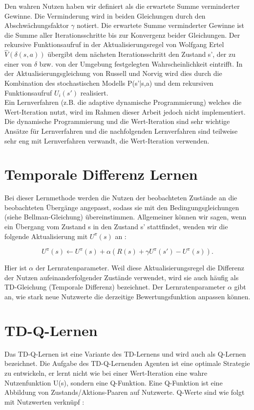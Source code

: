 Den wahren Nutzen haben wir definiert als die erwartete Summe verminderter Gewinne. Die Verminderung wird in beiden Gleichungen durch den Abschwächungsfaktor $\gamma$ notiert. Die erwartete Summe verminderter Gewinne ist die Summe aller Iterationsschritte bis zur Konvergenz beider Gleichungen. Der rekursive Funktionsaufruf in der Aktualisierungsregel von Wolfgang Ertel $\hat{V}(\delta(s,a))$ übergibt dem nächsten Iterationsschritt den Zustand s', der zu einer von $\delta$ bzw. von der Umgebung festgelegten Wahrscheinlichkeit eintrifft. In der Aktualisierungsgleichung von Russell und Norvig wird dies durch die Kombination des stochastischen Modells P(s'|s,a) und dem rekursiven Funktionsaufruf $U_i(s')$ realisiert.\\ 

Ein Lernverfahren (z.B. die adaptive dynamische Programmierung) welches die Wert-Iteration nutzt, wird im Rahmen dieser Arbeit jedoch nicht implementiert. Die dynamische Programmierung und die Wert-Iteration sind sehr wichtige Ansätze für Lernverfahren und die nachfolgenden Lernverfahren sind teilweise sehr eng mit Lernverfahren verwandt, die Wert-Iteration verwenden. \\

\section{Temporale Differenz Lernen}
\label{sec:Temporale Differenz Lernen}
Bei dieser Lernmethode werden die Nutzen der beobachteten Zustände an die beobachteten Übergänge angepasst, sodass sie mit den Bedingungsgleichungen (siehe Bellman-Gleichung) übereinstimmen. Allgemeiner können wir sagen, wenn ein Übergang vom Zustand s in den Zustand s' stattfindet, wenden wir die folgende Aktualisierung mit $U^\pi(s)$ an \cite[966\psq]{Russell}:

\begin{equation}
\label{eq:Aktualisierungsgleichung temporale Differenz}
U^\pi(s) \leftarrow U^\pi(s) + \alpha(R(s) + \gamma U^\pi(s') - U^\pi(s)).
\end{equation}

Hier ist $\alpha$ der Lernratenparameter. Weil diese Aktualisierungsregel die Differenz der Nutzen aufeinanderfolgender Zustände verwendet, wird sie auch häufig als TD-Gleichung (Temporale Differenz) bezeichnet. Der Lernratenparameter $\alpha$ gibt an, wie stark neue Nutzwerte die derzeitige Bewertungsfunktion anpassen können. 

\section{TD-Q-Lernen}
\label{sec:TD-Q-Lernen}
Das TD-Q-Lernen ist eine Variante des TD-Lernens und wird auch als Q-Lernen bezeichnet. Die Aufgabe des TD-Q-Lernenden Agenten ist eine optimale Strategie zu entwickeln, er lernt nicht wie bei einer Wert-Iteration eine wahre Nutzenfunktion U(s), sondern eine Q-Funktion. Eine Q-Funktion ist eine Abbildung von Zustands/Aktions-Paaren auf Nutzwerte. Q-Werte sind wie folgt mit Nutzwerten verknüpf \cite[973]{Russell}:

